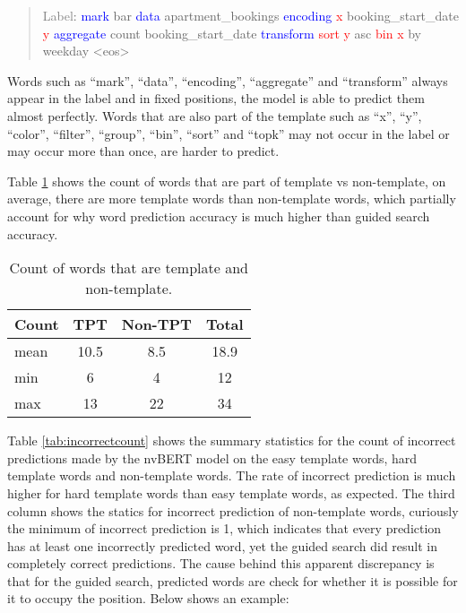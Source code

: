 \documentclass[
	a4paper, %
	10pt, %
	unnumberedsections, %
	twoside, %
]{t0003}
\newcommand{\blue}[1]{\textcolor{blue}{#1}}
\newcommand{\gray}[1]{\textcolor{gray}{#1}}
\newcommand{\red}[1]{\textcolor{red}{#1}}
\begin{document}
\begin{quote}
\gray{Label}: \blue{mark} bar \blue{data} apartment\_bookings \blue{encoding} \red{x} booking\_start\_date \red{y} \blue{aggregate} count booking\_start\_date \blue{transform} \red{sort} \red{y} asc \red{bin} \red{x} by weekday <eos>
\end{quote}

Words such as ``mark'', ``data'', ``encoding'', ``aggregate'' and ``transform'' always appear in the label and in fixed positions, the model is able to predict them almost perfectly. Words that are also part of the template such as ``x'', ``y'', ``color'', ``filter'', ``group'', ``bin'', ``sort'' and ``topk'' may not occur in the label or may occur more than once, are harder to predict.

Table \ref{tab:count} shows the count of words that are part of template vs non-template, on average, there are more template words than non-template words, which partially account for why word prediction accuracy is much higher than guided search accuracy.

\begin{table}
	\caption{Count of words that are template and non-template.}
	\centering
	\begin{tabular}{ lccc }
		\toprule
		Count & TPT & Non-TPT & Total  \\
		\midrule
		mean & 10.5 & 8.5 & 18.9 \\
                  min & 6 & 4 & 12 \\
                  max & 13 & 22 & 34 \\
		\bottomrule
	\end{tabular}
	\label{tab:count}
\end{table}

Table \ref{tab:incorrectcount} shows the summary statistics for the count of incorrect predictions made by the nvBERT model on the easy template words, hard template words and non-template words. The rate of incorrect prediction is much higher for hard template words than easy template words, as expected. The third column shows the statics for incorrect prediction of non-template words, curiously the minimum of incorrect prediction is 1, which indicates that every prediction has at least one incorrectly predicted word, yet the guided search did result in completely correct predictions. The cause behind this apparent discrepancy is that for the guided search, predicted words are check for whether it is possible for it to occupy the position. Below shows an example:
\end{document}
